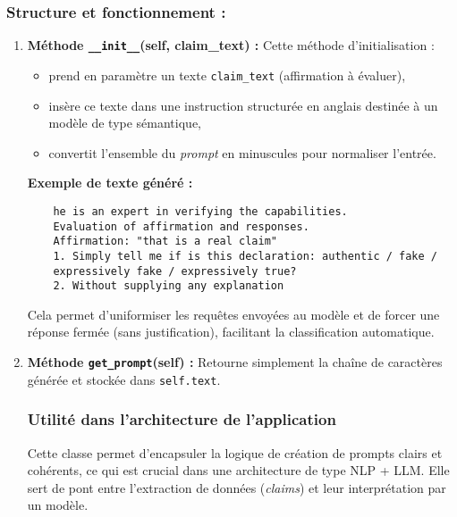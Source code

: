 \begin{description}
\begin{description}
\subsubsection*{Structure et fonctionnement :}

\begin{enumerate}
    \item \textbf{Méthode \texttt{\_\_init\_\_}(self, claim\_text) :}
    Cette méthode d'initialisation :
    \begin{itemize}
        \item prend en paramètre un texte \texttt{claim\_text} (affirmation à évaluer),
        \item insère ce texte dans une instruction structurée en anglais destinée à un modèle de type sémantique,
        \item convertit l'ensemble du \textit{prompt} en minuscules pour normaliser l'entrée.
    \end{itemize}

    \textbf{Exemple de texte généré :}
    \begin{verbatim}
    he is an expert in verifying the capabilities.
    Evaluation of affirmation and responses.
    Affirmation: "that is a real claim"
    1. Simply tell me if is this declaration: authentic / fake / 
    expressively fake / expressively true?
    2. Without supplying any explanation
    \end{verbatim}
    Cela permet d'uniformiser les requêtes envoyées au modèle et de forcer une réponse fermée (sans justification), facilitant la classification automatique.

    \item \textbf{Méthode \texttt{get\_prompt}(self) :} %
    Retourne simplement la chaîne de caractères générée et stockée dans \texttt{self.text}. %
    


\subsubsection*{Utilité dans l'architecture de l'application}
Cette classe permet d'encapsuler la logique de création de prompts clairs et cohérents, ce qui est crucial dans une architecture de type NLP + LLM. Elle sert de pont entre l'extraction de données (\textit{claims}) et leur interprétation par un modèle.
     

\end{enumerate}
\end{description}
\end{description}
